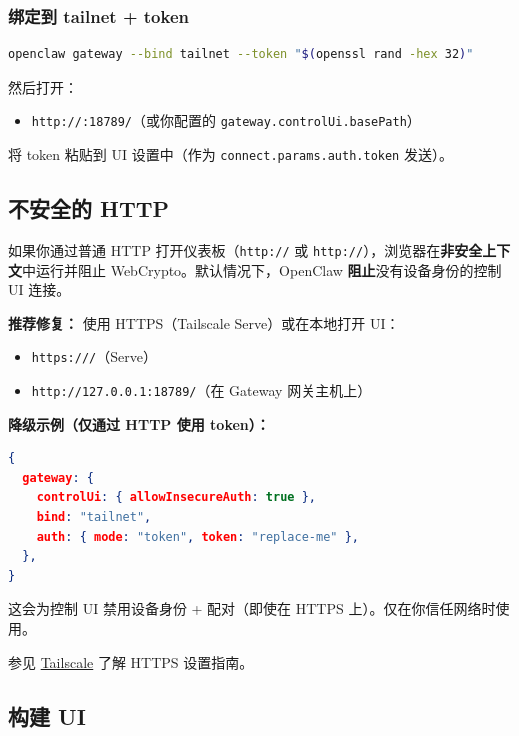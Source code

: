 \subsubsection{绑定到 tailnet + token}


\begin{lstlisting}[language=bash]
openclaw gateway --bind tailnet --token "$(openssl rand -hex 32)"
\end{lstlisting}


然后打开：

\begin{itemize}
  \item \texttt{http://:18789/}（或你配置的 \texttt{gateway.controlUi.basePath}）
\end{itemize}


将 token 粘贴到 UI 设置中（作为 \texttt{connect.params.auth.token} 发送）。

\subsection{不安全的 HTTP}


如果你通过普通 HTTP 打开仪表板（\texttt{http://} 或 \texttt{http://}），浏览器在\textbf{非安全上下文}中运行并阻止 WebCrypto。默认情况下，OpenClaw \textbf{阻止}没有设备身份的控制 UI 连接。

\textbf{推荐修复：} 使用 HTTPS（Tailscale Serve）或在本地打开 UI：

\begin{itemize}
  \item \texttt{https:///}（Serve）
  \item \texttt{http://127.0.0.1:18789/}（在 Gateway 网关主机上）
\end{itemize}


\textbf{降级示例（仅通过 HTTP 使用 token）：}

\begin{lstlisting}[language=json]
{
  gateway: {
    controlUi: { allowInsecureAuth: true },
    bind: "tailnet",
    auth: { mode: "token", token: "replace-me" },
  },
}
\end{lstlisting}


这会为控制 UI 禁用设备身份 + 配对（即使在 HTTPS 上）。仅在你信任网络时使用。

参见 \href{/gateway/tailscale}{Tailscale} 了解 HTTPS 设置指南。

\subsection{构建 UI}



